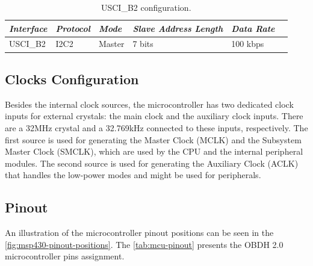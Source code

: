 \begin{table}[!h]
    \centering
    \begin{tabular}{llllll}
        \toprule[1.5pt]
        \textit{Interface} & \textit{Protocol} & \textit{Mode}  & \textit{Slave Address Length} & \textit{Data Rate} \\
        \midrule
        USCI\_B2           & I2C2              & Master         & 7 bits                        & 100 kbps  \\
        \bottomrule[1.5pt]
    \end{tabular}
    \caption{USCI\_B2 configuration.}
    \label{tab:usci-b2-config}
\end{table}


\subsection{Clocks Configuration}

Besides the internal clock sources, the microcontroller has two dedicated clock inputs for external crystals: the main clock and the auxiliary clock inputs. There are a 32MHz crystal and a 32.769kHz connected to these inputs, respectively. The first source is used for generating the Master Clock (MCLK) and the Subsystem Master Clock (SMCLK), which are used by the CPU and the internal peripheral modules. The second source is used for generating the Auxiliary Clock (ACLK) that handles the low-power modes and might be used for peripherals.

\subsection{Pinout}

An illustration of the microcontroller pinout positions can be seen in the \autoref{fig:msp430-pinout-positions}. The \autoref{tab:mcu-pinout} presents the OBDH 2.0 microcontroller pins assignment.

